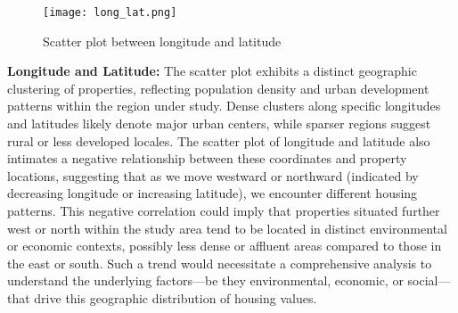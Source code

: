 \documentclass[12pt]{article}
\begin{document}
\begin{figure}[htbp]
	\centering
	\texttt{[image: long\_lat.png]}
	\caption{Scatter plot between longitude and latitude}
	\label{fig:long_lat}
\end{figure}
\textbf{Longitude and Latitude: }The scatter plot exhibits a distinct geographic clustering of properties, reflecting population density and urban development patterns within the region under study. Dense clusters along specific longitudes and latitudes likely denote major urban centers, while sparser regions suggest rural or less developed locales. 
The scatter plot of longitude and latitude also intimates a negative relationship between these coordinates and property locations, suggesting that as we move westward or northward (indicated by decreasing longitude or increasing latitude), we encounter different housing patterns. This negative correlation could imply that properties situated further west or north within the study area tend to be located in distinct environmental or economic contexts, possibly less dense or affluent areas compared to those in the east or south. Such a trend would necessitate a comprehensive analysis to understand the underlying factors—be they environmental, economic, or social—that drive this geographic distribution of housing values.
\end{document}
